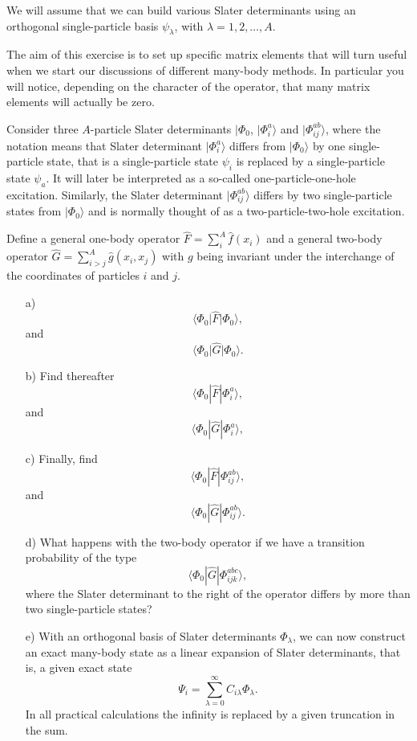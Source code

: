   \begin{prob}\label{problem:hamiltoniansetup}
  We will assume that we can build various Slater determinants using
  an orthogonal single-particle basis $\psi_{\lambda}$, with $\lambda= 1,2,\dots,A$.


  The aim of this exercise is to set up specific matrix elements that
  will turn useful when we start our discussions of different
  many-body methods. In particular you will notice, depending on the
  character of the operator, that many matrix elements will actually
  be zero.

  Consider three $A$-particle Slater determinants $|\Phi_0$,
  $|\Phi_i^a\rangle$ and $|\Phi_{ij}^{ab}\rangle$, where the notation
  means that Slater determinant $|\Phi_i^a\rangle$ differs from
  $|\Phi_0\rangle$ by one single-particle state, that is a
  single-particle state $\psi_i$ is replaced by a single-particle
  state $\psi_a$.  It will later be interpreted as a so-called
  one-particle-one-hole excitation.  Similarly, the Slater determinant
  $|\Phi_{ij}^{ab}\rangle$ differs by two single-particle states from
  $|\Phi_0\rangle$ and is normally thought of as a
  two-particle-two-hole excitation.

  Define a general one-body operator $\hat{F} =
  \sum_{i}^A\hat{f}(x_{i})$ and a general two-body operator
  $\hat{G}=\sum_{i>j}^A\hat{g}(x_{i},x_{j})$ with $g$ being invariant
  under the interchange of the coordinates of particles $i$ and $j$.
  \begin{enumerate}
  \item[a)]
  \[
  \langle \Phi_0 \vert\hat{F}\vert\Phi_0\rangle,
  \]
  and
  \[
  \langle \Phi_0\vert\hat{G}|\Phi_0\rangle.
  \]
  \item[b)] Find thereafter
  \[
  \langle \Phi_0 |\hat{F}|\Phi_i^a\rangle,
  \]
  and
  \[
  \langle \Phi_0|\hat{G}|\Phi_i^a\rangle,
  \]
  \item[c)] Finally, find
  \[
  \langle \Phi_0 |\hat{F}|\Phi_{ij}^{ab}\rangle,
  \]
  and
  \[
  \langle \Phi_0|\hat{G}|\Phi_{ij}^{ab}\rangle.
  \]
  \item[d)] What happens with the two-body operator if we have a
    transition probability of the type
  \[
  \langle \Phi_0|\hat{G}|\Phi_{ijk}^{abc}\rangle,
  \]
  where the Slater determinant to the right of the operator differs by
  more than two single-particle states?
  \item[e)] With an orthogonal basis of Slater determinants
    $\Phi_{\lambda}$, we can now construct an exact many-body state as
    a linear expansion of Slater determinants, that is, a given exact
    state
  \[
  \Psi_i = \sum_{\lambda =0}^{\infty}C_{i\lambda}\Phi_{\lambda}.
  \]
  In all practical calculations the infinity is replaced by a given
  truncation in the sum.


\end{enumerate}
\end{prob}
